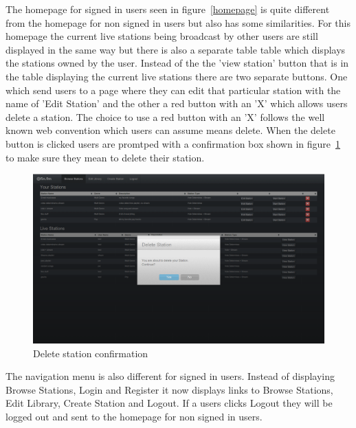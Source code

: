 \documentclass[a4paper, 12pt]{report}
\begin{document}
The homepage for signed in users seen in figure~\ref{homepage} is quite different from the homepage for non signed in users but also has some similarities. For this homepage the current live stations being broadcast by other users are still displayed in the same way but there is also a separate table table which displays the stations owned by the user. Instead of the the 'view station' button that is in the table displaying the current live stations there are two separate buttons. One which send users to a page where they can edit that particular station with the name of 'Edit Station' and the other a red button with an 'X' which allows users delete a station. The choice to use a red button with an 'X' follows the well known web convention which users can assume means delete. 
When the delete button is clicked users are promtped with a confirmation box shown in figure~\ref{delete-confirm} to make sure they mean to delete their station.  \\
\begin{figure}[H]
  \centering
    \includegraphics[width=1.0\textwidth]{screenshots/delete-station-confirm.png}
    \caption{Delete station confirmation}
    \label{delete-confirm}
\end{figure}
The navigation menu is also different for signed in users. Instead of displaying Browse Stations, Login and Register it now displays links to  Browse Stations, Edit Library, Create Station and Logout. If a users clicks Logout they will be logged out and sent to the homepage for non signed in users.
\end{document}
